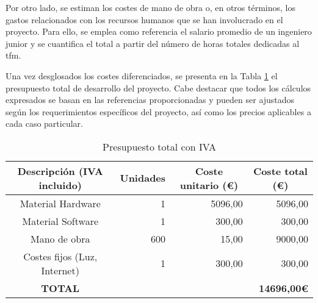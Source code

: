 \vspace{3mm}

Por otro lado, se estiman los costes de mano de obra o, en otros términos, los gastos relacionados con los recursos humanos que se han involucrado en el proyecto. Para ello, se emplea como referencia el salario promedio de un ingeniero junior y se cuantifica el total a partir del número de horas totales dedicadas al \gls{tfm}. 

\vspace{3mm}

Una vez desglosados los costes diferenciados, se presenta en la Tabla \ref{tab:budget} el presupuesto total de desarrollo del proyecto. Cabe destacar que todos los cálculos expresados se basan en las referencias proporcionadas y pueden ser ajustados según los requerimientos específicos del proyecto, así como los precios aplicables a cada caso particular.

\vspace{3mm}

\begin{table}[ht]
	\centering
	\begin{tabular}{|c|r|r|r|}
		\hline
		\rowcolor[HTML]{EFEFEF}
		Descripción (IVA incluido) & \multicolumn{1}{c|}{\cellcolor[HTML]{EFEFEF}Unidades} & \multicolumn{1}{c|}{\cellcolor[HTML]{EFEFEF}Coste unitario (€)} & \multicolumn{1}{c|}{\cellcolor[HTML]{EFEFEF}Coste total (€)} \\ \hline
		Material Hardware & 1 & 5096,00 & 5096,00 \\ \hline
		Material Software & 1 & 300,00 & 300,00 \\ \hline
		Mano de obra & 600 & 15,00 & 9000,00 \\ \hline
		Costes fijos (Luz, Internet) & 1 & 300,00 & 300,00 \\ \hline
		\rowcolor[HTML]{FFFFC7}
		\textbf{TOTAL}  & \multicolumn{3}{r|}{\cellcolor[HTML]{FFFFC7}\textbf{14696,00€}} \\ \hline
	\end{tabular}
	\caption{Presupuesto total con IVA}
	\label{tab:budget}
\end{table}

